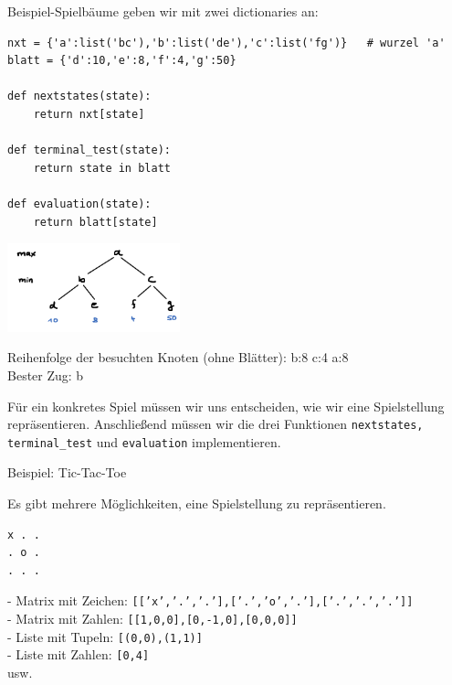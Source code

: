 \begin{frame}[fragile]
 
Beispiel-Spielbäume geben wir mit zwei dictionaries an:
\begin{lstlisting}[basicstyle=\tiny]
nxt = {'a':list('bc'),'b':list('de'),'c':list('fg')}   # wurzel 'a'
blatt = {'d':10,'e':8,'f':4,'g':50}
 
def nextstates(state):
    return nxt[state]
        
def terminal_test(state):
    return state in blatt

def evaluation(state):
    return blatt[state]
\end{lstlisting} 

\pause
\includegraphics[width=5cm]{minmax_folie01.png} 

Reihenfolge der besuchten Knoten (ohne Blätter):  b:8 c:4 a:8 \\
Bester Zug: b
\end{frame}



\begin{frame}[fragile]
Für ein konkretes Spiel müssen wir uns entscheiden, wie wir eine Spielstellung repräsentieren. Anschließend müssen wir die drei Funktionen \texttt{nextstates, terminal\_test} und \texttt{evaluation} implementieren.

Beispiel: Tic-Tac-Toe

Es gibt mehrere Möglichkeiten, eine Spielstellung zu repräsentieren.
\begin{lstlisting} 
x . . 
. o . 
. . . 
\end{lstlisting}  \pause
- Matrix mit Zeichen: \texttt{[['x','.','.'],['.','o','.'],['.','.','.']]} \\
- Matrix mit Zahlen:   \texttt{[[1,0,0],[0,-1,0],[0,0,0]]} \\
- Liste mit Tupeln: \texttt{[(0,0),(1,1)]} \\
- Liste mit Zahlen: \texttt{[0,4]} \\
usw.

\end{frame}

